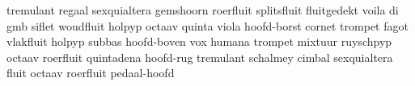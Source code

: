 \starttable[|||||||||]
\NC tremulant    \NC regaal      \NC sexquialtera \NC gemshoorn    \NC
    roerfluit    \NC splitsfluit \NC fluitgedekt  \NC              \NC \AR
\NC voila di gmb \NC siflet      \NC woudfluit    \NC holpyp       \NC
    octaav       \NC quinta      \NC viola        \NC hoofd-borst  \NC \AR
\NC              \NC cornet      \NC trompet      \NC fagot        \NC
    vlakfluit    \NC holpyp      \NC subbas       \NC hoofd-boven  \NC \AR
\NC vox humana   \NC trompet     \NC mixtuur      \NC ruyschpyp    \NC
    octaav       \NC roerfluit   \NC quintadena   \NC hoofd-rug    \NC \AR
\NC tremulant    \NC schalmey    \NC cimbal       \NC sexquialtera \NC
    fluit        \NC octaav      \NC roerfluit    \NC pedaal-hoofd \NC \AR
\stoptable
